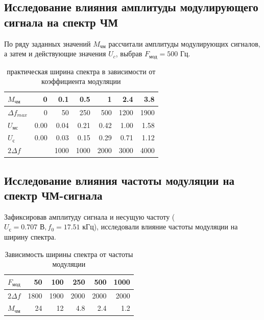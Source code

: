 \subsection{Исследование влияния амплитуды модулирующего сигнала на спектр ЧМ}
По ряду заданных значений $M_\text{чм}$ рассчитали амплитуды модулирующих сигналов, а затем и действующие значения $U_c$, выбрав $F_\text{мод}=500\text{ Гц}$.
\begin{table}[htbp]
  \centering
  \caption{практическая ширина спектра в зависимости от коэффициента модуляции}
    \begin{tabular}{|l|r|r|r|r|r|r|}
    \toprule
    $M_\text{чм}$ & 0     & 0.1   & 0.5   & 1     & 2.4   & 3.8 \\
    \midrule
    $\Delta f_{max}$ & 0     & 50    & 250   & 500   & 1200  & 1900 \\
    \midrule
    $U_\text{мс}$ & 0.00  & 0.04  & 0.21  & 0.42  & 1.00  & 1.58 \\
    \midrule
    $U_\text{с}$  & 0.00  & 0.03  & 0.15  & 0.29  & 0.71  & 1.12 \\
    \midrule
    $2 \Delta f$ &       & 1000  & 1000  & 2000  & 3000  & 4000 \\
    \bottomrule
    \end{tabular}%
  \label{tab:tab2}%
\end{table}%
\subsection{Исследование влияния частоты модуляции на спектр ЧМ-сигнала}
Зафиксировав амплитуду сигнала и несущую частоту ($U_\text{с}=0.707\text{ В}, f_0=17.51\text{ кГц}$), исследовали влияние частоты модуляции на ширину спектра.
\begin{table}[htbp]
  \centering
  \caption{Зависимость ширины спектра от частоты модуляции}
    \begin{tabular}{|l|r|r|r|r|r|}
    \toprule
    $F_\text{мод}$ & 50    & 100   & 250   & 500   & 1000 \\
    \midrule
    $2 \Delta f$ & 1800  & 1900  & 2000  & 2000  & 2000 \\
    \midrule
    $M_\text{чм}$ & 24    & 12    & 4.8   & 2.4   & 1.2 \\
    \bottomrule
    \end{tabular}%
  \label{tab:tab3}%
\end{table}%
